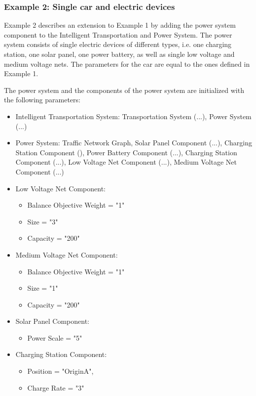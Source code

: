 \subsubsection{Example 2: Single car and electric devices}
Example 2 describes an extension to Example 1 by adding the power system component to the Intelligent Transportation and Power System. The power system consists of single electric devices of different types, i.e. one charging station, one solar panel, one power battery, as well as single low voltage and medium voltage nets. The parameters for the car are equal to the ones defined in Example 1.

The power system and the components of the power system are initialized with the following parameters:

\begin{itemize}
	\item Intelligent Transportation System: Transportation System (...), Power System (...)
	\item Power System: Traffic Network Graph, Solar Panel Component (...), Charging Station Component (), Power Battery Component (...), Charging Station Component (...), Low Voltage Net Component (...), Medium Voltage Net Component (...)
	
	\item Low Voltage Net Component:
	\begin{itemize}  
		\item Balance Objective Weight = "1"
		\item Size = "3"
		\item Capacity = "200"
	\end{itemize}
	
	\item Medium Voltage Net Component:
	\begin{itemize}  
		\item Balance Objective Weight = "1"
		\item Size = "1"
		\item Capacity = "200"
	\end{itemize}
	
	\item Solar Panel Component:
	\begin{itemize}
		\item Power Scale = "5"
	\end{itemize}	
	
	\item Charging Station Component:
	\begin{itemize}
		\item Position = "OriginA", 
		\item Charge Rate = "3"
	\end{itemize}
	

\end{itemize}
